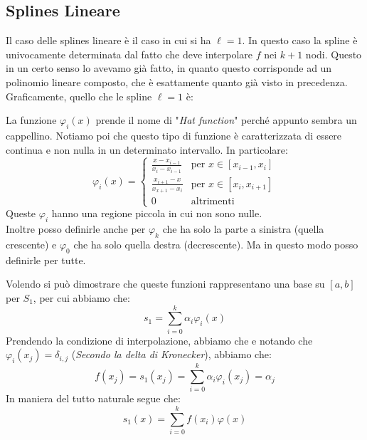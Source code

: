 \documentclass[11pt,a4paper,twoside]{article}
\theoremstyle{definition}
\begin{document}
\subsection{Splines Lineare}

Il caso delle splines lineare è il caso in cui si ha $\ell = 1$. In questo caso la spline è univocamente determinata dal fatto che deve interpolare $f$ nei $k+1$ nodi. Questo in un certo senso lo avevamo già fatto, in quanto questo corrisponde ad un polinomio lineare composto, che è esattamente quanto già visto in precedenza.\\
Graficamente, quello che le spline $\ell = 1$ è:

\begin{center}
\end{center}
La funzione $\varphi_i(x)$ prende il nome di "\textit{Hat function}" perché appunto sembra un cappellino. Notiamo poi che questo tipo di funzione è caratterizzata di essere continua e non nulla in un determinato intervallo. In particolare:
\[
	\varphi_i(x) = \begin{cases}
		\displaystyle{\frac{x-x_{i-1}}{x_i-x_{i-1}}} & \text{per } x\in [x_{i-1}, x_i]\\
		\displaystyle{\frac{x_{i+1}-x}{x_{x+1}-x_i}} & \text{per } x\in [x_i, x_{i+1}]\\
		0 & \text{altrimenti}
	\end{cases}
\]
Queste $\varphi_i$ hanno una regione piccola in cui non sono nulle.\\
Inoltre posso definirle anche per $\varphi_k$ che ha solo la parte a sinistra (quella crescente) e $\varphi_0$ che ha solo quella destra (decrescente). Ma in questo modo posso definirle per tutte.

Volendo si può dimostrare che queste funzioni rappresentano una base su $[a,b]$ per $S_1$, per cui abbiamo che:
\[ s_1 = \sum_{i = 0}^k \alpha_i \varphi_i(x)\]
Prendendo la condizione di interpolazione, abbiamo che e notando che $\varphi_i(x_j) = \delta_{i,j}$ (\textit{Secondo la delta di Kronecker}), abbiamo che:
\[ f(x_j) = s_1(x_j) = \sum_{i = 0}^k \alpha_i \varphi_i(x_j) = \alpha_j \]
In maniera del tutto naturale segue che:
\[s_1(x) = \sum_{i = 0}^k f(x_i) \varphi(x)\]
\end{document}
